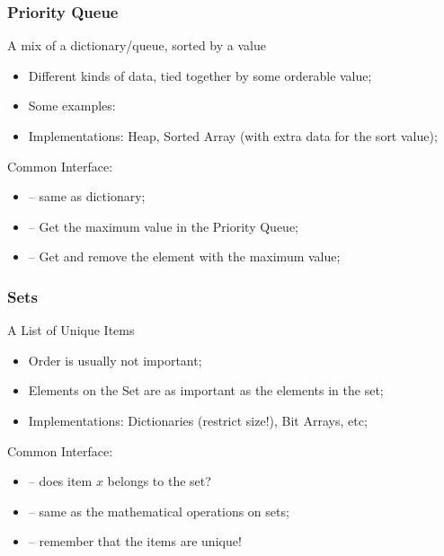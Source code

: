 \begin{frame}
  \frametitle{Priority Queue}
  \begin{center}
    A mix of a dictionary/queue, sorted by a value
  \end{center}
  \begin{itemize}
  \item Different kinds of data, tied together by some orderable
    value;
  \item Some examples:\\
    {\small
    }
  \item Implementations: Heap, Sorted Array (with extra data for the
    sort value);
  \end{itemize}
  \begin{block}{Common Interface:}
    \begin{itemize}
    \item {} -- same as dictionary;
    \item {} -- Get the maximum value in the Priority Queue;
    \item {} -- Get and remove the element with the maximum value;
    \end{itemize}
  \end{block}
\end{frame}

\begin{frame}
  \frametitle{Sets}
  \begin{center}
    A List of Unique Items
  \end{center}

  \begin{itemize}
  \item Order is usually not important;
  \item Elements  on the Set are as important as the elements in the set;
  \item Implementations: Dictionaries (restrict size!), Bit Arrays, etc;
  \end{itemize}
  \begin{block}{Common Interface:}
    \begin{itemize}
      \item {} -- does item $x$ belongs to the set?
      \item {} -- same as the mathematical operations on sets;
      \item {} -- remember that the items are unique!
    \end{itemize}
  \end{block}
\end{frame}


